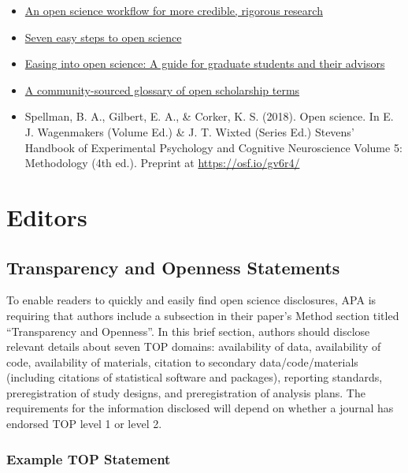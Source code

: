 \documentclass[
  oneside]{book}
\begin{document}
\begin{itemize}
\item
  \href{https://psyarxiv.com/wu6sn}{An open science workflow for more credible, rigorous research} \citep{corker2021open}
\item
  \href{https://doi.org/10.1027/2151-2604/a000387}{Seven easy steps to open science} \citep{cruwell2019seven}
\item
  \href{https://doi.org/10.1525/collabra.18684}{Easing into open science: A guide for graduate students and their advisors} \citep{kathawalla2021easing}
\item
  \href{https://doi.org/10.1038/s41562-021-01269-4}{A community-sourced glossary of open scholarship terms} \citep{parsons2022community}
\item
  Spellman, B. A., Gilbert, E. A., \& Corker, K. S. (2018). Open science. In E. J. Wagenmakers (Volume Ed.) \& J. T. Wixted (Series Ed.) Stevens' Handbook of Experimental Psychology and Cognitive Neuroscience Volume 5: Methodology (4th ed.). Preprint at \url{https://osf.io/gv6r4/}
\end{itemize}

\hypertarget{part-editors}{%
\part{Editors}\label{part-editors}}

\hypertarget{editors-top}{%
\chapter{Transparency and Openness Statements}\label{editors-top}}

To enable readers to quickly and easily find open science disclosures, APA is requiring that authors include a subsection in their paper's Method section titled ``Transparency and Openness''. In this brief section, authors should disclose relevant details about seven TOP domains: availability of data, availability of code, availability of materials, citation to secondary data/code/materials (including citations of statistical software and packages), reporting standards, preregistration of study designs, and preregistration of analysis plans. The requirements for the information disclosed will depend on whether a journal has endorsed TOP level 1 or level 2.

\hypertarget{example-top-statement}{%
\section{Example TOP Statement}\label{example-top-statement}}
\end{document}
